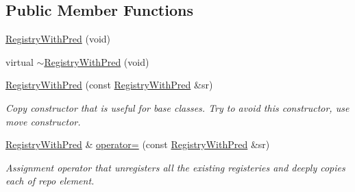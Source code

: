 \subsection*{Public Member Functions}
\begin{DoxyCompactItemize}
\item 
\hyperlink{classel_1_1base_1_1utils_1_1_registry_with_pred_a564214aff7fdbd5370e777dd0c15e615}{Registry\+With\+Pred} (void)
\item 
virtual \hyperlink{classel_1_1base_1_1utils_1_1_registry_with_pred_ae822bdfa235ace08c1d8faa8365fd240}{$\sim$\+Registry\+With\+Pred} (void)
\item 
\hyperlink{classel_1_1base_1_1utils_1_1_registry_with_pred_a0e75c7daaa5fbf824b29180c7a5fd155}{Registry\+With\+Pred} (const \hyperlink{classel_1_1base_1_1utils_1_1_registry_with_pred}{Registry\+With\+Pred} \&sr)
\begin{DoxyCompactList}\small\item\em Copy constructor that is useful for base classes. Try to avoid this constructor, use move constructor. \end{DoxyCompactList}\item 
\hyperlink{classel_1_1base_1_1utils_1_1_registry_with_pred}{Registry\+With\+Pred} \& \hyperlink{classel_1_1base_1_1utils_1_1_registry_with_pred_adb7e568c8cb084589467b937eab86b86}{operator=} (const \hyperlink{classel_1_1base_1_1utils_1_1_registry_with_pred}{Registry\+With\+Pred} \&sr)
\begin{DoxyCompactList}\small\item\em Assignment operator that unregisters all the existing registeries and deeply copies each of repo element. \end{DoxyCompactList}\end{DoxyCompactItemize}
